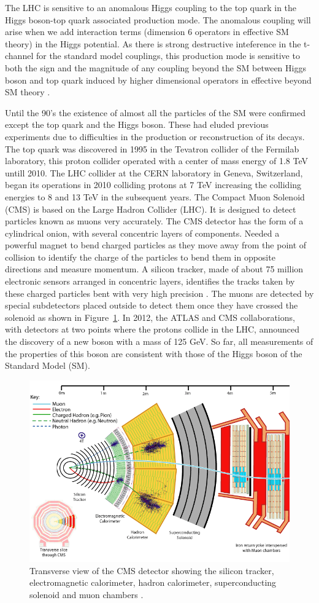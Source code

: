 \documentclass[final,3p]{CSP}
\begin{document}
The LHC is sensitive to an anomalous Higgs coupling to the top quark in the Higgs boson-top quark associated production mode. 
The anomalous coupling will arise when we add interaction terms (dimension 6 operators in effective SM theory) in the Higgs potential.
As there is strong destructive inteference in the t-channel for the standard model  couplings, this production mode is sensitive to both the sign and the magnitude of any coupling beyond the SM between Higgs  boson and top quark induced by higher dimensional operators in effective beyond SM theory \cite{sirunyan2019search}.
\fi

Until the 90's the existence of almost all the particles of the SM were confirmed except the top quark and the Higgs boson. 
These had eluded previous experiments due to difficulties in the production or reconstruction of its decays. The top quark was 
discovered in 1995 in the Tevatron collider of the Fermilab laboratory, this proton collider operated with a center of mass 
energy of 1.8 TeV untill 2010. The LHC collider at the CERN laboratory in Geneva, Switzerland, began its operations in 2010 
colliding protons at 7 TeV increasing the colliding energies to 8 and 13 TeV in the subsequent years. The Compact Muon Solenoid (CMS) is based on the Large Hadron Collider (LHC). It is designed to detect particles known as muons very accurately. The CMS detector has the form of a cylindrical onion, with several concentric layers of components. Needed a powerful magnet to bend charged particles as they move away from the point of collision to identify the charge of the particles to bend them in opposite directions and measure momentum. A silicon tracker, made of about 75 
million electronic sensors arranged in concentric layers, identifies the tracks taken by these charged particles bent with very high precision \cite{Chatrchyan:2008aa}. The muons are detected by special subdetectors placed outside to detect them once they have crossed the solenoid as shown in Figure~\ref{figure5}. In 2012, the ATLAS and CMS collaborations, with detectors at two points where the protons collide in the LHC, announced the discovery of a new boson with a mass of 125 GeV. So far, all measurements of the properties of this boson are consistent with those of the Higgs boson of the Standard Model (SM).

  \begin{figure}[H]
    \centering
    \includegraphics[width=0.6\columnwidth]{./cms12.png}
    \caption{Transverse view of the CMS detector showing the silicon tracker, electromagnetic calorimeter, hadron calorimeter, superconducting solenoid and muon chambers \cite{Chatrchyan:2008aa}.}
    \label{figure5}
  \end{figure}
  
\end{document}

